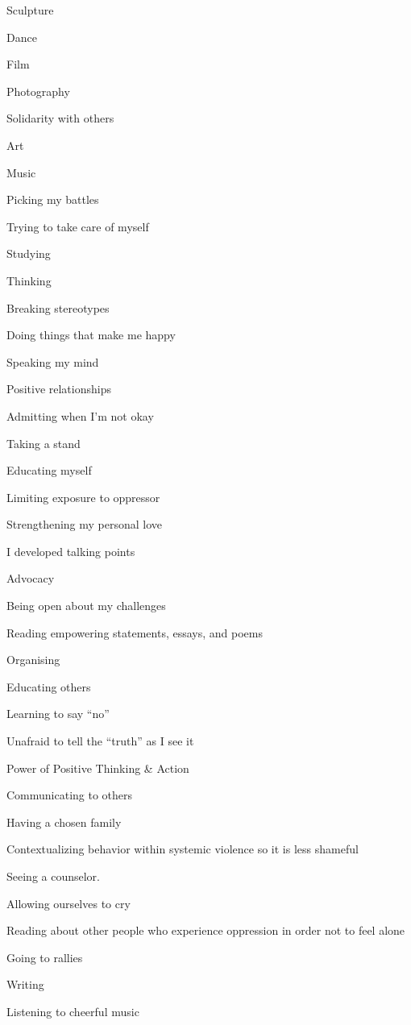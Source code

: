 \begin{multicols}{2}
\begin{checkboxlist}
\item Sculpture
\item Dance
\item Film
\item Photography
\item Solidarity with others
\item Art
\item Music
\item Picking my battles
\item Trying to take care of myself
\item Studying
\item Thinking
\item Breaking stereotypes
\item Doing things that make me happy
\item Speaking my mind
\item Positive relationships
\item Admitting when I’m not okay
\item Taking a stand
\item Educating myself
\item Limiting exposure to oppressor
\item Strengthening my personal love
\item I developed talking points
\item Advocacy
\item Being open about my challenges
\item Reading empowering statements, essays, and poems
\item Organising
\item Educating others
\item Learning to say “no”
\item Unafraid to tell the “truth” as I see it
\item Power of Positive Thinking \& Action
\item Communicating to others
\item Having a chosen family
\item Contextualizing behavior within systemic violence so it is less shameful
\item Seeing a counselor.
\item Allowing ourselves to cry
\item Reading about other people who experience oppression in order not to feel alone
\item Going to rallies
\item Writing
\item Listening to cheerful music

\end{checkboxlist}
\end{multicols}
